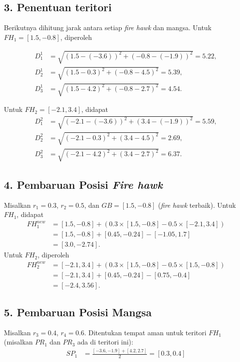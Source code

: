 \begin{contoh}
\subsection*{3. Penentuan teritori}
Berikutnya dihitung jarak antara setiap \textit{fire hawk} dan mangsa.
Untuk $FH_1 = [1.5, -0.8]$, diperoleh
\begin{flushleft}
\begin{align*}
    D_1^1 &= \sqrt{(1.5 - (-3.6))^2 + (-0.8 - (-1.9))^2} = 5.22, \\
    D_2^1 &= \sqrt{(1.5 - 0.3)^2 + (-0.8 - 4.5)^2} = 5.39, \\
    D_3^1 &= \sqrt{(1.5 - 4.2)^2 + (-0.8 - 2.7)^2} = 4.54.
\end{align*}
\end{flushleft}
Untuk $FH_2 = [-2.1, 3.4]$, didapat
\begin{align*}
    D_1^2 &= \sqrt{(-2.1-(-3.6))^2 + (3.4-(-1.9))^2} = 5.59, \\
    D_2^2 &= \sqrt{(-2.1-0.3)^2 + (3.4-4.5)^2} = 2.69, \\
    D_3^2 &= \sqrt{(-2.1-4.2)^2 + (3.4-2.7)^2} = 6.37.
\end{align*}

\subsection*{4. Pembaruan Posisi \textit{Fire hawk}}
Misalkan $r_1 = 0.3$, $r_2 = 0.5$, dan $GB = [1.5, -0.8]$ (\textit{fire hawk} terbaik).
Untuk $FH_1$, didapat
\begin{align*}
    FH_1^{new} &= [1.5, -0.8] + (0.3 \times [1.5, -0.8] - 0.5 \times [-2.1, 3.4]) \\
    &= [1.5, -0.8] + [0.45, -0.24] - [-1.05, 1.7] \\
    &= [3.0, -2.74].
\end{align*}
Untuk $FH_2$, diperoleh
\begin{align*}
    FH_2^{new} &= [-2.1, 3.4] + (0.3 \times [1.5, -0.8] - 0.5 \times [1.5, -0.8]) \\
    &= [-2.1, 3.4] + [0.45, -0.24] - [0.75, -0.4] \\
    &= [-2.4, 3.56].
\end{align*}

\subsection*{5. Pembaruan Posisi Mangsa}
Misalkan $r_3 = 0.4$, $r_4 = 0.6$. Ditentukan tempat aman untuk teritori $FH_1$ (misalkan $PR_1$ dan $PR_3$ ada di teritori ini):
\begin{align*}
    SP_1 &= \frac{[-3.6, -1.9] + [4.2, 2.7]}{2} = [0.3, 0.4]
\end{align*}


\end{contoh}

